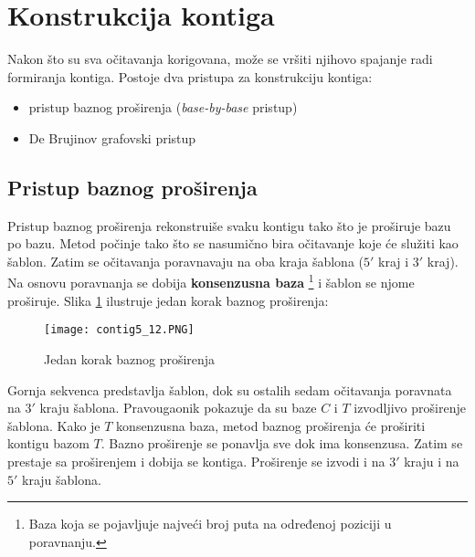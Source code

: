 \documentclass[12pt,oneside]{memoir}
\begin{document}
\newpage

\section{Konstrukcija kontiga}

Nakon što su sva očitavanja korigovana, može se vršiti njihovo spajanje radi formiranja kontiga. Postoje dva pristupa za konstrukciju kontiga:
\begin{itemize}
    \item{pristup baznog proširenja (\textit{base-by-base} pristup)}
    \item{De Brujinov grafovski pristup}
\end{itemize}

\subsection{Pristup baznog proširenja}

Pristup baznog proširenja rekonstruiše svaku kontigu tako što je proširuje bazu po bazu. Metod počinje tako što se nasumično bira očitavanje koje će služiti kao šablon. Zatim se očitavanja poravnavaju na oba kraja šablona ($5'$ kraj i $3'$ kraj). Na osnovu poravnanja se dobija \textbf{konsenzusna baza} \footnote{Baza koja se pojavljuje najveći broj puta na određenoj poziciji u poravnanju.} i šablon se njome proširuje. Slika \ref{fig:7} ilustruje jedan korak baznog proširenja:

\begin{figure}[!ht]
  \centering
  \texttt{[image: contig5\_12.PNG]}
\caption{Jedan korak baznog proširenja}
\label{fig:7}
\end{figure}

Gornja sekvenca predstavlja šablon, dok su ostalih sedam očitavanja poravnata na $3'$ kraju šablona. Pravougaonik pokazuje da su baze $C$ i $T$ izvodljivo proširenje šablona. Kako je $T$ konsenzusna baza, metod baznog proširenja će proširiti kontigu bazom $T$. Bazno proširenje se ponavlja sve dok ima konsenzusa. Zatim se prestaje sa proširenjem i dobija se kontiga. Proširenje se izvodi i na $3'$ kraju i na $5'$ kraju šablona.

\begin{comment}
Slika \ref{fig:8} daje pseudokod ovog metoda:

\begin{figure}[!ht]
\centering
\texttt{[image: SimpleAsembler5\_13.PNG]}
\caption{Jednostavan base-by-base asembler proširenja}
\label{fig:8}
\source{\cite{WingKinSung} str. 138, slika 5.13}
\end{figure}

\end{comment}
\end{document}

